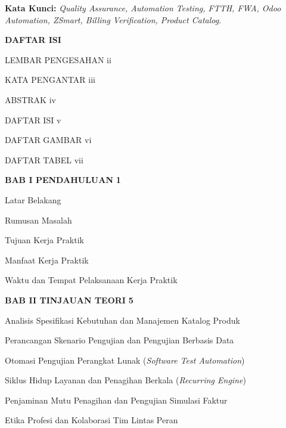 \documentclass[12pt,a4paper]{article}
\begin{document}
\vspace{0.6cm}
\noindent\textbf{Kata Kunci:} \textit{Quality Assurance, Automation Testing, FTTH, FWA, Odoo Automation, ZSmart, Billing Verification, Product Catalog}.

\clearpage
\begin{center}
    {\bfseries\large DAFTAR ISI\par}
\end{center}
\vspace{0.3cm}

\begin{singlespace}
\noindent LEMBAR PENGESAHAN \dotfill ii\par
\noindent KATA PENGANTAR \dotfill iii\par
\noindent ABSTRAK \dotfill iv\par
\noindent DAFTAR ISI \dotfill v\par
\noindent DAFTAR GAMBAR \dotfill vi\par
\noindent DAFTAR TABEL \dotfill vii\par
\vspace{0.2cm}
\noindent\textbf{BAB I PENDAHULUAN} \dotfill \textbf{1}\par
{} Latar Belakang \par
{} Rumusan Masalah \par
{} Tujuan Kerja Praktik \par
{} Manfaat Kerja Praktik \par
{} Waktu dan Tempat Pelaksanaan Kerja Praktik \par
\vspace{0.2cm}
\noindent\textbf{BAB II TINJAUAN TEORI} \dotfill \textbf{5}\par
{} Analisis Spesifikasi Kebutuhan dan Manajemen Katalog Produk \par
{} Perancangan Skenario Pengujian dan Pengujian Berbasis Data \par
{} Otomasi Pengujian Perangkat Lunak (\textit{Software Test Automation}) \par
{} Siklus Hidup Layanan dan Penagihan Berkala (\textit{Recurring Engine}) \par
{} Penjaminan Mutu Penagihan dan Pengujian Simulasi Faktur \par
{} Etika Profesi dan Kolaborasi Tim Lintas Peran \par

\end{singlespace}
\end{document}
